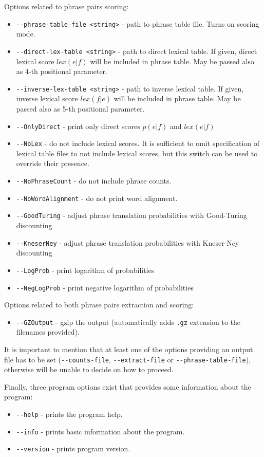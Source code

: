 Options related to phrase pairs scoring:
\begin{itemize}
 \item \verb|--phrase-table-file <string>| - path to phrase table file.
  Turns on scoring mode.
 \item \verb|--direct-lex-table <string>| - path to direct lexical table.
  If given, direct lexical score $lex(e|f)$ will be included in phrase table.
  May be passed also as 4-th positional parameter.
 \item \verb|--inverse-lex-table <string>| - path to inverse lexical table.
  If given, inverse lexical score $lex(f|e)$ will be included in phrase table.
  May be passed also as 5-th positional parameter.
 \item \verb|--OnlyDirect| - print only direct scores $p(e|f)$ and $lex(e|f)$
 \item \verb|--NoLex| - do not include lexical scores.
  It is sufficient to omit specification of lexical table files to not
  include lexical scores, but this switch can be used to override their presence.
 \item \verb|--NoPhraseCount| - do not include phrase counts.  
 \item \verb|--NoWordAlignment| - do not print word alignment.
 \item \verb|--GoodTuring| - adjust phrase translation probabilities with
  Good-Turing discounting
 \item \verb|--KneserNey| - adjust phrase translation probabilities with
  Kneser-Ney discounting
 \item \verb|--LogProb| - print logarithm of probabilities
 \item \verb|--NegLogProb| - print negative logarithm of probabilities
\end{itemize}

Options related to both phrase pairs extraction and scoring:
\begin{itemize}
 \item \verb|--GZOutput| - gzip the output (automatically
  adds \texttt{.gz} extension to the filenames provided).
\end{itemize}

It is important to mention that at least one of the options providing an output
file has to be set (\verb|--counts-file|, \verb|--extract-file| or \verb|--phrase-table-file|),
otherwise \eppex{} will be unable to decide on how to proceed.

Finally, three program options exist that provides some information about the program:
\begin{itemize}
 \item \verb|--help| - prints the program help.
 \item \verb|--info| - prints basic information about the program.
 \item \verb|--version| - prints program version.
\end{itemize}

